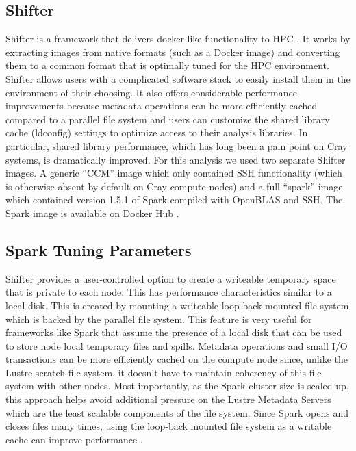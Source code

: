 \subsection{Shifter} \label{shiftersec}
Shifter is a framework that delivers docker-like functionality to HPC \cite{shifter}. It works by extracting images from native formats (such as a Docker image) and converting them to a common format that is optimally tuned for the HPC environment. %
Shifter allows users with a complicated software stack to easily install them in the environment of their choosing. It also offers considerable performance improvements because metadata operations can be more efficiently cached compared to a parallel file system and users can customize the shared library cache (ldconfig) settings to optimize access to their analysis libraries. In particular, shared library performance, which has long been a pain point on Cray systems, is dramatically improved. For this analysis we used two separate Shifter images. A generic “CCM” image which only contained SSH functionality (which is otherwise absent by default on Cray compute nodes) and a full “spark” image which contained version 1.5.1 of Spark  compiled with OpenBLAS \cite{openblas} and SSH. The Spark image is available on Docker Hub \cite{dockerspark}. 

\subsection{Spark Tuning Parameters}
Shifter provides a user-controlled option to create a writeable temporary space that is private to each node. This has performance characteristics similar to a local disk. This is created by mounting a writeable loop-back mounted file system which is backed by the parallel file system. This feature is very useful for frameworks like Spark that assume the presence of a local disk that can be used to store node local temporary files and spills. Metadata operations and small I/O transactions can  be more efficiently cached on the compute node since, unlike the Lustre scratch file system, it doesn't have to maintain coherency of this file system with other nodes. Most importantly, as the Spark cluster size is scaled up, this approach helps avoid additional pressure on the Lustre Metadata Servers which are the least scalable components of the file system. Since Spark opens and closes files many times, using the loop-back mounted file system as a writable cache can improve performance \cite{scalingspark16}.

